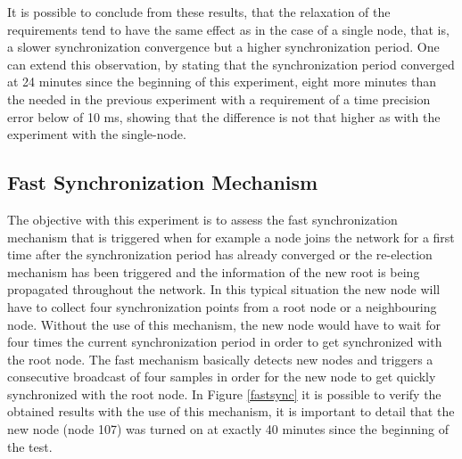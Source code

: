 It is possible to conclude from these results, that the relaxation of the requirements tend to have the same effect as in the case of a single node, that is, a slower synchronization convergence but a higher synchronization period. One can extend this observation, by stating that the synchronization period converged at 24 minutes since the beginning of this experiment, eight more minutes than the needed in the previous experiment with a requirement of a time precision error below of 10 ms, showing that the difference is not that higher as with the experiment with the single-node.

\clearpage

\subsection{Fast Synchronization Mechanism}
The objective with this experiment is to assess the fast synchronization mechanism that is triggered when for example a node joins the network for a first time after the synchronization period has already converged or the re-election mechanism has been triggered and the information of the new root is being propagated throughout the network. In this typical situation the new node will have to collect four synchronization points from a root node or a neighbouring node. Without the use of this mechanism, the new node would have to wait for four times the current synchronization period in order to get synchronized with the root node. The fast mechanism basically detects new nodes and triggers a consecutive broadcast of four samples in order for the new node to get quickly synchronized with the root node. In Figure \ref{fastsync} it is possible to verify the obtained results with the use of this mechanism, it is important to detail that the new node (node 107) was turned on at exactly 40 minutes since the beginning of the test.

